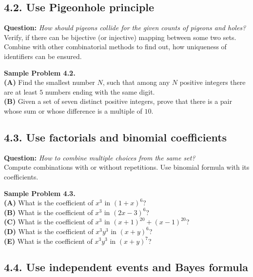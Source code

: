 \documentclass[jou]{apa6}
\begin{document}
\subsection{4.2. Use Pigeonhole principle} 

{\bf Question:} {\em How should pigeons collide for the given counts of pigeons and holes?}\\
{\scriptsize 
Verify, if there can be bijective (or injective) 
mapping between some two sets. Combine with other combinatorial 
methods to find out, how uniqueness of identifiers can be ensured.
}


\vspace{6pt}
{\bf Sample Problem 4.2.}\\ 
{\bf (A)} Find the smallest number $N$, 
such that among any $N$ positive integers 
there are at least $5$ numbers ending with the same digit.\\
{\bf (B)} Given a set of seven distinct positive integers, 
prove that there is a pair whose sum or whose
difference is a multiple of $10$.




\subsection{4.3. Use factorials and binomial coefficients} 

{\bf Question:} {\em How to combine multiple choices from the same set?}\\
{\scriptsize 
Compute combinations with or without repetitions. Use binomial formula with its coefficients. 
}

\vspace{6pt}
{\bf Sample Problem 4.3.}\\
{\bf (A)} What is the coefficient of $x^3$ in $(1 + x)^6$? \\
{\bf (B)} What is the coefficient of $x^3$ in $(2x - 3)^6$?\\
{\bf (C)} What is the coefficient of $x^3$ in $(x + 1)^{20} + (x-1)^{20}$? \\
{\bf (D)} What is the coefficient of $x^3y^3$ in $(x+y)^6$? \\
{\bf (E)} What is the coefficient of $x^3y^3$ in $(x+y)^7$?

\subsection{4.4. Use independent events and Bayes formula}
\end{document}
